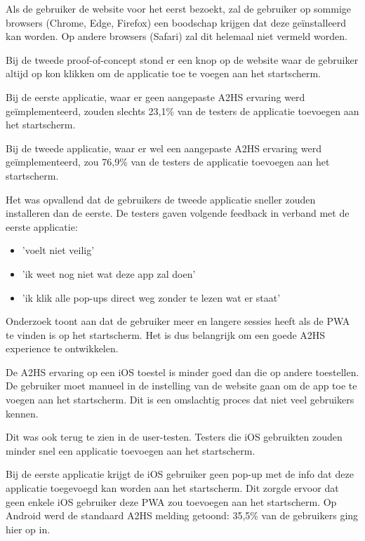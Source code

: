 		Als de gebruiker de website voor het eerst bezoekt, zal de gebruiker op sommige browsers (Chrome, Edge, Firefox) een boodschap krijgen dat deze geïnstalleerd kan worden. Op andere browsers (Safari) zal dit helemaal niet vermeld worden.
				
		Bij de tweede proof-of-concept stond er een knop op de website waar de gebruiker altijd op kon klikken om de applicatie toe te voegen aan het startscherm. 
		
		Bij de eerste applicatie, waar er geen aangepaste A2HS ervaring werd geïmplementeerd, zouden slechts 23,1\% van de testers de applicatie toevoegen aan het startscherm.  
		
		Bij de tweede applicatie, waar er wel een aangepaste A2HS ervaring werd geïmplementeerd, zou 76,9\% van de testers de applicatie toevoegen aan het startscherm.
		
		Het was opvallend dat de gebruikers de tweede applicatie sneller zouden installeren dan de eerste. De testers gaven volgende feedback in verband met de eerste applicatie:
		\begin{itemize}
	  		\item 'voelt niet veilig'
			\item 'ik weet nog niet wat deze app zal doen'
			\item 'ik klik alle pop-ups direct weg zonder te lezen wat er staat'
	  	\end{itemize}	

		Onderzoek \autocite{LePage2020b} toont aan dat de gebruiker meer en langere sessies heeft als de PWA te vinden is op het startscherm. Het is dus belangrijk om een goede A2HS experience te ontwikkelen.
		
		De A2HS ervaring op een iOS toestel is minder goed dan die op andere toestellen. De gebruiker moet manueel in de instelling van de website gaan om de app toe te voegen aan het startscherm. Dit is een omslachtig proces dat niet veel gebruikers kennen. 
		
		Dit was ook terug te zien in de user-testen. Testers die iOS gebruikten zouden minder snel een applicatie toevoegen aan het startscherm. 
		
		Bij de eerste applicatie krijgt de iOS gebruiker geen pop-up met de info dat deze applicatie toegevoegd kan worden aan het startscherm. Dit zorgde ervoor dat geen enkele iOS gebruiker deze PWA zou toevoegen aan het startscherm. Op Android werd de standaard A2HS melding getoond: 35,5\% van de gebruikers ging hier op in.
		
